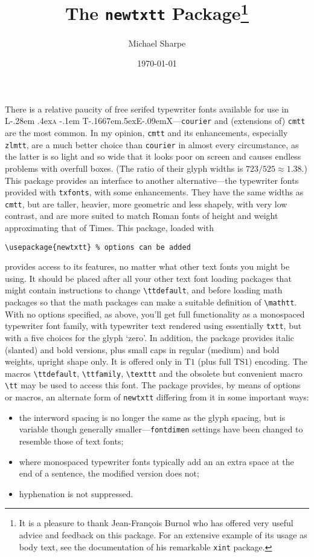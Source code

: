 \documentclass{article}
\title{The \texttt{newtxtt} Package\thanks{It is a pleasure to thank Jean-Fran\c{c}ois Burnol who has offered very useful advice and feedback on this package. For an extensive example of its usage as body text, see  the documentation of his remarkable {\tt xint} package.}
}
\author{Michael Sharpe}
\date{\today}  %
\makeatletter
\def\TeX{T\kern-.1667em\lower.5ex\hbox{E}\kern-.09emX\@}
\DeclareRobustCommand{\LaTeX}{L\kern-.28em%
\raise.4ex\hbox{\textsc{a}}%
        \kern-.1em%
        \TeX}
\makeatother
\begin{document}
\maketitle
There is a relative paucity of free serifed typewriter fonts available for use  in \LaTeX---{\tt courier}
 and (extensions of) {\tt cmtt} are the most common.  In my opinion, {\tt cmtt} and its enhancements, especially {\tt zlmtt}, are a much better choice than {\tt courier} in almost every circumstance, as the latter is so light and so wide that it looks poor on screen and causes endless problems with overfull boxes. (The ratio of their glyph widths is $723/525\approx1.38$.) This package provides an interface to another alternative---the typewriter fonts provided with {\tt txfonts}, with some enhancements. They have the same widths as {\tt cmtt}, but are taller, heavier, more geometric and less shapely, with  very low contrast, and are more suited to match Roman fonts of height and weight approximating that of Times. This package, loaded with
\begin{verbatim}
\usepackage{newtxtt} % options can be added
\end{verbatim}
provides access to its features, no matter what other text fonts you might be using. It should be placed after all your other text font loading packages that might contain instructions to change \verb|\ttdefault|, and before loading math packages so that the math packages can make a suitable definition of \verb|\mathtt|. With no options specified, as above, you'll get full functionality as a monospaced typewriter font family, with typewriter text rendered using essentially {\tt txtt}, but with a five choices for the glyph  `zero'. In addition, the package  provides italic (slanted) and bold versions, plus small caps in regular (medium) and bold weights, upright shape only. It is offered  only in T$1$ (plus full TS$1$) encoding. The macros \verb|\ttdefault|, \verb|\ttfamily|, \verb|\texttt| and the obsolete but convenient macro \verb|\tt| may be used to access this font. 
 The package provides, by means of options or macros, an alternate form of {\tt newtxtt} differing from it in some important ways:
 \begin{itemize}
 \item 
 the interword spacing is no longer the same as the glyph spacing, but is variable though generally smaller---{\tt fontdimen} settings have been changed to resemble those of text fonts;
 \item
 where monospaced typewriter fonts typically add an an extra space at the end of a sentence, the modified version does not;
 \item
 hyphenation is not suppressed.
 \end{itemize}
\end{document}
